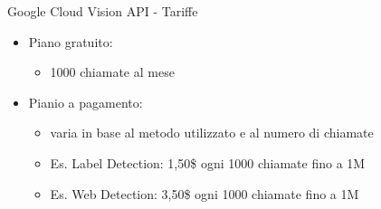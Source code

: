 %
\begin{frame}[t]{Google Cloud Vision API - Tariffe}
\begin{itemize}
	\item Piano gratuito:
	\begin{itemize}
		\item 1000 chiamate al mese
	\end{itemize}
	\item Pianio a pagamento:
	\begin{itemize}
		\item varia in base al metodo utilizzato e al numero di chiamate
		\item Es. \textsf{Label Detection}: 1,50\$ ogni 1000 chiamate fino a 1M
		\item Es. \textsf{Web Detection}: 3,50\$ ogni 1000 chiamate fino a 1M
	\end{itemize}
\end{itemize}
\end{frame}
%
